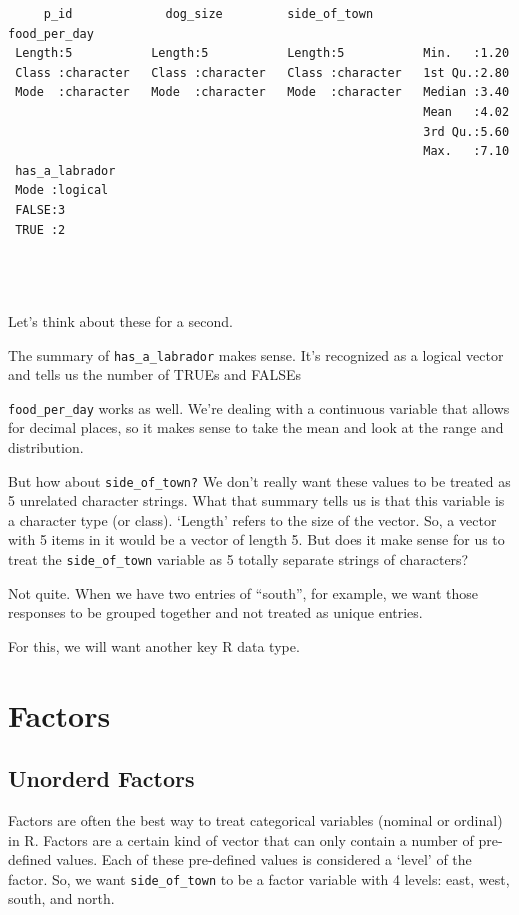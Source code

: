\documentclass[
  letterpaper,
  DIV=11,
  numbers=noendperiod]{scrreprt}
\begin{document}
\begin{verbatim}
     p_id             dog_size         side_of_town        food_per_day 
 Length:5           Length:5           Length:5           Min.   :1.20  
 Class :character   Class :character   Class :character   1st Qu.:2.80  
 Mode  :character   Mode  :character   Mode  :character   Median :3.40  
                                                          Mean   :4.02  
                                                          3rd Qu.:5.60  
                                                          Max.   :7.10  
 has_a_labrador 
 Mode :logical  
 FALSE:3        
 TRUE :2        
                
                
                
\end{verbatim}

Let's think about these for a second.

The summary of \texttt{has\_a\_labrador} makes sense. It's recognized as
a logical vector and tells us the number of TRUEs and FALSEs

\texttt{food\_per\_day} works as well. We're dealing with a continuous
variable that allows for decimal places, so it makes sense to take the
mean and look at the range and distribution.

But how about \texttt{side\_of\_town?} We don't really want these values
to be treated as 5 unrelated character strings. What that summary tells
us is that this variable is a character type (or class). `Length' refers
to the size of the vector. So, a vector with 5 items in it would be a
vector of length 5. But does it make sense for us to treat the
\texttt{side\_of\_town} variable as 5 totally separate strings of
characters?

Not quite. When we have two entries of ``south'', for example, we want
those responses to be grouped together and not treated as unique
entries.

For this, we will want another key R data type.

\section{Factors}\label{factors}

\subsection{Unorderd Factors}\label{unorderd-factors}

Factors are often the best way to treat categorical variables (nominal
or ordinal) in R. Factors are a certain kind of vector that can only
contain a number of pre-defined values. Each of these pre-defined values
is considered a `level' of the factor. So, we want
\texttt{side\_of\_town} to be a factor variable with 4 levels: east,
west, south, and north.
\end{document}
